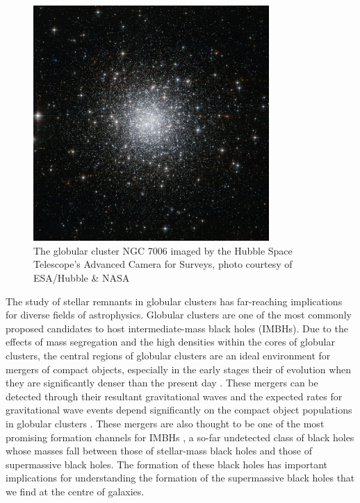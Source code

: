 \begin{figure}
	\centering
	\includegraphics[width=0.8\textwidth]{figures/c42.jpg}
	\caption{The globular cluster NGC 7006 imaged by the Hubble Space Telescope's Advanced
		Camera for Surveys, photo courtesy of ESA/Hubble \& NASA}
	\label{fig:1/ngc7006}
\end{figure}



The study of stellar remnants in globular clusters has far-reaching implications for diverse fields
of astrophysics. Globular clusters are one of the most commonly proposed candidates to host
intermediate-mass black holes (IMBHs). Due to the effects of mass segregation and the high densities
within the cores of globular clusters, the central regions of globular clusters are an ideal
environment for mergers of compact objects, especially in the early stages their of evolution when
they are significantly denser than the present day \citep[e.g.][]{PortegiesZwart2004,Rodriguez2021}.
These mergers can be detected through their resultant gravitational waves and the expected rates for
gravitational wave events depend significantly on the compact object populations in globular
clusters \citep[e.g][]{Weatherford2021}. These mergers are also thought to be one of the most promising
formation channels for IMBHs \citep[e.g.][]{Giersz2015}, a so-far undetected class of black holes
whose masses fall between those of stellar-mass black holes and those of supermassive black holes.
The formation of these black holes has important implications for understanding the formation of the
supermassive black holes that we find at the centre of galaxies.


